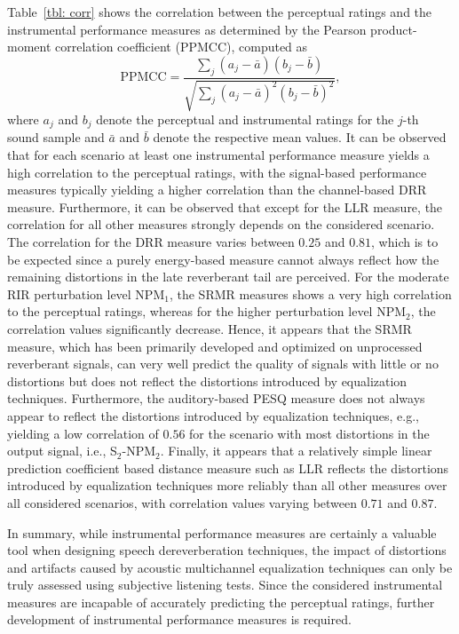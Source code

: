 \documentclass[fleqn]{aes2e}
\begin{document}
Table~\ref{tbl: corr} shows the correlation between the perceptual ratings and the instrumental performance measures as determined by the Pearson product-moment correlation coefficient (PPMCC), computed as
\begin{equation}
{\text{PPMCC}} = \frac{\sum_j (a_j - \bar{a})(b_j - \bar{b})}{\sqrt{\sum_j (a_j - \bar{a})^2(b_j - \bar{b})^2}},
\end{equation}
where $a_j$ and $b_j$ denote the perceptual and instrumental ratings for the $j$-th sound sample and $\bar{a}$ and $\bar{b}$ denote the respective mean values.
It can be observed that for each scenario at least one instrumental performance measure yields a high correlation to the perceptual ratings, with the signal-based performance measures typically yielding a higher correlation than the channel-based DRR measure.
Furthermore, it can be observed that except for the LLR measure, the correlation for all other measures strongly depends on the considered scenario.
The correlation for the DRR measure varies between $0.25$ and $0.81$, which is to be expected since a purely energy-based measure cannot always reflect how the remaining distortions in the late reverberant tail are perceived.
For the moderate RIR perturbation level NPM$_1$, the SRMR measures shows a very high correlation to the perceptual ratings, whereas for the higher perturbation level NPM$_2$, the correlation values significantly decrease.
Hence, it appears that the SRMR measure, which has been primarily developed and optimized on unprocessed reverberant signals, can very well predict the quality of signals with little or no distortions but does not reflect the distortions introduced by equalization techniques.
Furthermore, the auditory-based PESQ measure does not always appear to reflect the distortions introduced by equalization techniques, e.g., yielding a low correlation of $0.56$ for the scenario with most distortions in the output signal, i.e., S$_2$-NPM$_2$.
Finally, it appears that a relatively simple linear prediction coefficient based distance measure such as LLR reflects the distortions introduced by equalization techniques more reliably than all other measures over all considered scenarios, with correlation values varying between $0.71$ and $0.87$.

In summary, while instrumental performance measures are certainly a valuable tool when designing speech dereverberation techniques, the impact of distortions and artifacts caused by acoustic multichannel equalization techniques can only be truly assessed using subjective listening tests.
Since the considered instrumental measures are incapable of accurately predicting the perceptual ratings, further development of instrumental performance measures is required.
\end{document}

